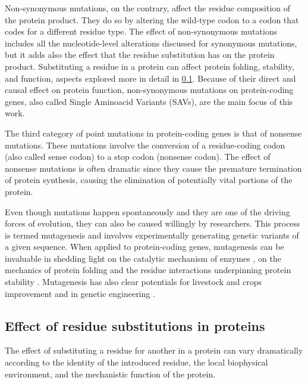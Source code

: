 Non-synonymous mutations, on the contrary, affect the residue composition of the protein product.
They do so by altering the wild-type codon to a codon that codes for a different residue type.
The effect of non-synonymous mutations includes all the nucleotide-level alterations discussed for synonymous mutations, but it adds also the effect that the residue substitution has on the protein product.
Substituting a residue in a protein can affect protein folding, stability, and function, aspects explored more in detail in \cref{sec:SAV}.
Because of their direct and causal effect on protein function, non-synonymous mutations on protein-coding genes, also called Single Aminoacid Variants (SAVs), are the main focus of this work.

The third category of point mutations in protein-coding genes is that of nonsense mutations.
These mutations involve the conversion of a residue-coding codon (also called sense codon) to a stop codon (nonsense codon).
The effect of nonsense mutations is often dramatic since they cause the premature termination of protein synthesis, causing the elimination of potentially vital portions of the protein.

Even though mutations happen spontaneously and they are one of the driving forces of evolution, they can also be caused willingly by researchers.
This process is termed mutagenesis and involves experimentally generating genetic variants of a given sequence.
When applied to protein-coding genes, mutagenesis can be invaluable in shedding light on the catalytic mechanism of enzymes \parencite{Peracchi2001}, on the mechanics of protein folding and the residue interactions underpinning protein stability \parencite{Nisthal2019}.
Mutagenesis has also clear potentials for livestock and crops improvement and in genetic engineering \parencite{Davies1988, Holme2019, Kalds2019}.

\subsection{Effect of residue substitutions in proteins}\label{sec:SAV}

The effect of substituting a residue for another in a protein can vary dramatically according to the identity of the introduced residue, the local biophysical environment, and the mechanistic function of the protein.


